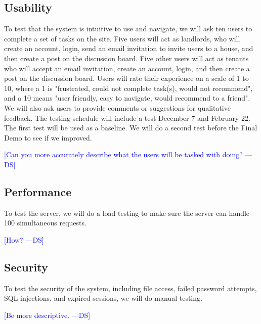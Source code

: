 \documentclass[12pt]{article}
\newcommand{\authornote}[3]{\textcolor{#1}{[#3 ---#2]}}
\newcommand{\authornote}[3]{}
\newcommand{\ds}[1]{\authornote{blue}{DS}{#1}}
\begin{document}
\subsection{Usability}
To test that the system is intuitive to use and navigate, we will ask ten users to complete a set of tasks on the site. Five users will act as landlords, who will create an account, login, send an email invitation to invite users to a house, and then create a post on the discussion board. Five other users will act as tenants who will accept an email invitation, create an account, login, and then create a post on the discussion board. Users will rate their experience on a scale of 1 to 10, where a 1 is "frustrated, could not complete task(s), would not recommend", and a 10 means "user friendly, easy to navigate, would recommend to a friend".  We will also ask users to provide comments or suggestions for qualitative feedback. The testing schedule will include a test December 7 and February 22. The first test will be used as a baseline. We will do a second test before the Final Demo to see if we improved.

\ds{Can you more accurately describe what the users will be tasked with doing?}

\subsection{Performance}
To test the server, we will do a load testing to make sure the server can handle 100 simultaneous requests.

\ds{How?}

\subsection{Security}
To test the security of the system, including file access, failed password attempts, SQL injections, and expired sessions, we will do manual testing.

\ds{Be more descriptive.}
\end{document}
